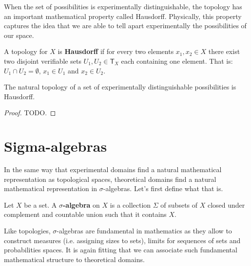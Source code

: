 \documentclass[11pt,letterpaper,fleqn]{memoir} %
\begin{document}
When the set of possibilities is experimentally distinguishable, the topology has an important mathematical property called Hausdorff. Physically, this property captures the idea that we are able to tell apart experimentally the possibilities of our space.
\begin{mathSection}
	\begin{defn}
		A topology for $X$ is \textbf{Hausdorff} if for every two elements $x_1, x_2 \in X$ there exist two disjoint verifiable sets $U_1, U_2 \in \mathsf{T}_X$ each containing one element. That is: $U_1 \cap U_2 = \emptyset$, $x_1 
		\in U_1$ and $x_2 \in U_2$.
	\end{defn}
	\begin{prop}
		The natural topology of a set of experimentally distinguishable possibilities is Hausdorff.
\end{prop}
\begin{proof}
	TODO.
\end{proof}
\end{mathSection}

\section{Sigma-algebras}

In the same way that experimental domains find a natural mathematical representation as topological spaces, theoretical domains find a natural mathematical representation in $\sigma$-algebras. Let's first define what that is.

\begin{mathSection}
	\begin{defn}
		Let $X$ be a set. A \textbf{$\sigma$-algebra} on $X$ is a collection $\Sigma$ of subsets of $X$ closed under complement and countable union such that it contains $X$.
	\end{defn}
\end{mathSection}

Like topologies, $\sigma$-algebras are fundamental in mathematics as they allow to construct measures (i.e. assigning sizes to sets), limits for sequences of sets and probabilities spaces. It is again fitting that we can associate such fundamental mathematical structure to theoretical domains.
\end{document}
